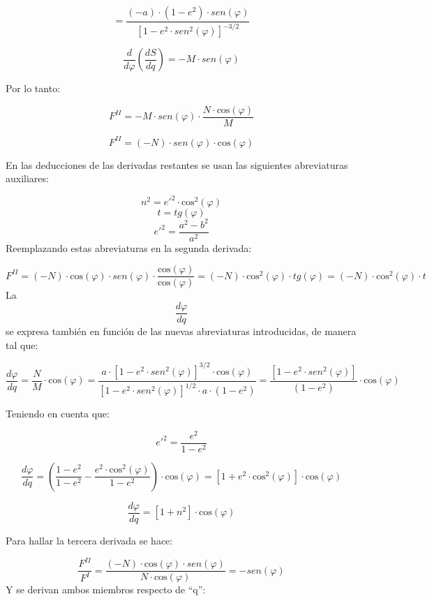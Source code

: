 \documentclass[]{article}
\begin{document}
\[=\frac{\left(-a\right)\cdot \left(1-e^2\right)\cdot sen\left(\varphi \right)}{\left[1-e^2\cdot sen^2\left(\varphi \right)\right]^{-3/2}}\]

\[\frac{d}{d\varphi}\left(\frac{dS}{dq}\right)=-M\cdot sen\left(\varphi \right)\]

Por lo tanto:

\[F^{II}=-M\cdot sen\left(\varphi \right)\cdot {\frac{N\cdot \text{cos}\left(\varphi \right)}{M}}\]

\[F^{II}=\left(-N\right)\cdot sen\left(\varphi \right)\cdot \text{cos}\left(\varphi \right)\]

En las deducciones de las derivadas restantes se usan las siguientes
abreviaturas auxiliares:

\[n^2=e'^2\cdot \text{cos}^2\left(\varphi \right)\]
\[t=tg\left(\varphi \right)\] \[e'^2=\frac{a^2-b^2}{a^2}\] Reemplazando
estas abreviaturas en la segunda derivada:

\[F^{II}=\left(-N\right)\cdot
\text{cos}\left(\varphi \right)\cdot
sen\left(\varphi \right)\cdot
{\frac{\text{cos}\left(\varphi \right)}{\text{cos}\left(\varphi
\right)}}=\left(-N\right)\cdot \text{cos}^2\left(\varphi
\right)\cdot tg\left(\varphi
\right)=\left(-N\right)\cdot \text{cos}^2\left(\varphi \right)\cdot
t\] La \[\frac{d\varphi }{dq}\] se expresa también en función de las
nuevas abreviaturas introducidas, de manera tal que:

\[\frac{d\varphi}{dq}=\frac{N}{M}\cdot \text{cos}\left(\varphi \right)=\frac{a\cdot \left[1-e^2\cdot sen^2\left(\varphi \right)\right]^{3/2}\cdot \text{cos}\left(\varphi \right)}{\left[1-e^2\cdot sen^2\left(\varphi \right)\right]^{1/2}\cdot a\cdot \left(1-e^2\right)}=\frac{\left[1-e^2\cdot sen^2\left(\varphi \right)\right]}{\left(1-e^2\right)}\cdot \text{cos}\left(\varphi \right)\]

Teniendo en cuenta que:

\[e'^2=\frac{e^2}{1-e^2}\]

\[\frac{d\varphi}{dq}=\left(\frac{1-e^2}{1-e^2}-\frac{e^2\cdot \text{cos}^2\left(\varphi \right)}{1-e^2}\right)\cdot \text{cos}\left(\varphi \right)=\left[1+e^2\cdot \text{cos}^2\left(\varphi \right)\right]\cdot \text{cos}\left(\varphi \right)\]

\[\frac{d\varphi}{dq}=\left[1+n^2\right]\cdot \text{cos}\left(\varphi \right)\]

Para hallar la tercera derivada se hace:

\[\frac{F^{II}}{F^I}=\frac{\left(-N\right)\cdot
\text{cos}\left(\varphi \right)\cdot
sen\left(\varphi \right)}{N\cdot
\text{cos}\left(\varphi
\right)}=-sen\left(\varphi \right)\] Y se derivan ambos miembros
respecto de ``q'':
\end{document}
